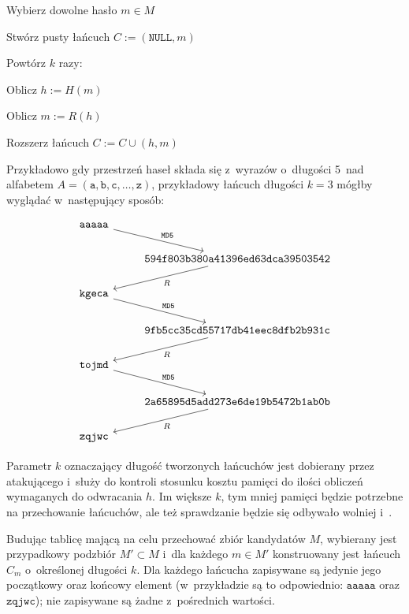 \begin{myenumerate}

    \item Wybierz dowolne hasło $m \in M$

    \item Stwórz pusty łańcuch $C := (\texttt{NULL}, m)$

    \item Powtórz $k$ razy:

    \begin{myenumerate}

        \item Oblicz $h := H(m)$

        \item Oblicz $m := R(h)$

        \item Rozszerz łańcuch $C := C \cup (h, m)$

    \end{myenumerate}

\end{myenumerate}

Przykładowo gdy przestrzeń haseł składa się z~wyrazów o~długości 5~nad
alfabetem $A = (\mathtt{a}, \mathtt{b}, \mathtt{c}, \ldots, \mathtt{z})$,
przykładowy łańcuch długości $k=3$ mógłby wyglądać w~następujący sposób:

\[
\begin{tikzcd}
    \mathtt{aaaaa} \arrow{rd}{\mathtt{MD5}} & \\
    & \arrow{ld}{R} \mathtt{594f803b380a41396ed63dca39503542} \\
    \mathtt{kgeca} \arrow{rd}{\mathtt{MD5}} & \\
    & \arrow{ld}{R} \mathtt{9fb5cc35cd55717db41eec8dfb2b931c} \\
    \mathtt{tojmd} \arrow{rd}{\mathtt{MD5}} & \\
    & \arrow{ld}{R} \mathtt{2a65895d5add273e6de19b5472b1ab0b} \\
    \mathtt{zqjwc}
\end{tikzcd}
\]

Parametr $k$ oznaczający długość tworzonych łańcuchów jest dobierany przez
atakującego i~służy do kontroli stosunku kosztu pamięci do ilości obliczeń
wymaganych do odwracania $h$. Im większe $k$, tym mniej pamięci będzie
potrzebne na przechowanie łańcuchów, ale też sprawdzanie będzie się odbywało
wolniej i~.

Budując tablicę mającą na celu przechować zbiór kandydatów $M$, wybierany jest
przypadkowy podzbiór $M' \subset M$ i~dla każdego $m \in M'$ konstruowany jest
łańcuch $C_m$ o~określonej długości $k$. Dla każdego łańcucha zapisywane są
jedynie jego początkowy oraz końcowy element (w~przykładzie są to odpowiednio:
$\mathtt{aaaaa}$ oraz $\mathtt{zqjwc}$); nie zapisywane są żadne z~pośrednich
wartości.

